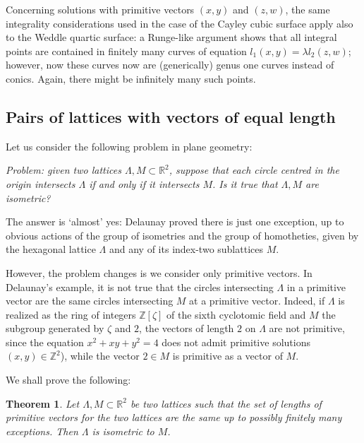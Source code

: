 \documentclass[leqno,12pt]{article} %
\def\Z{{{\mathbb Z}}}
\def\R{{{\mathbb R}}}
\theoremstyle{plain} %
\newtheorem{theorem}{\indent\sc Theorem}[section]
\theoremstyle{definition} %
\begin{document}
\smallskip

Concerning solutions with primitive vectors $(x,y)$ and $(z,w)$, the same integrality considerations used in the case of the Cayley cubic surface apply also to the Weddle quartic surface: a Runge-like argument shows that all integral points are contained in finitely many curves of equation $l_1(x,y)=\lambda l_2(z,w)$; however, now these curves now are (generically) genus one curves instead of conics. Again, there might be infinitely many such points.





\subsection{Pairs of lattices with vectors of equal length} 
Let us consider the following problem in plane geometry: \smallskip

{\it Problem: given two lattices $\Lambda, M\subset\R^2$, suppose that each circle centred in the origin intersects $\Lambda$ if and only if it intersects $M$. Is it true that $\Lambda,M$ are isometric?}

\smallskip

The answer is `almost' yes: Delaunay proved there is just one exception, up to obvious actions of the group of isometries and the group of homotheties, given by the hexagonal lattice $\Lambda$ and any of its index-two sublattices $M$. 

However, the problem changes is we consider only primitive vectors. In Delaunay's example,  it is not true that the circles intersecting $\Lambda$ in a primitive vector are the same circles intersecting $M$ at a primitive vector.  Indeed, if $\Lambda$ is realized as the ring of integers $\Z[\zeta]$ of the sixth cyclotomic field and $M$ the subgroup generated by $\zeta$ and $2$, the vectors of length $2$ on $\Lambda$ are not primitive, since the equation $x^2+xy+y^2=4$ does not admit primitive solutions $(x,y)\in\Z^2$), while the vector $2\in M$ is primitive as a vector of $M$.

\smallskip


\smallskip


We shall prove the following: 

\begin{theorem}\label{T.lattices}
Let $\Lambda, M\subset\R^2$ be two lattices such that the set of lengths of primitive vectors for the two lattices are the same up to possibly finitely many exceptions. Then $\Lambda$ is isometric to $M$. 
\end{theorem}
\end{document}
